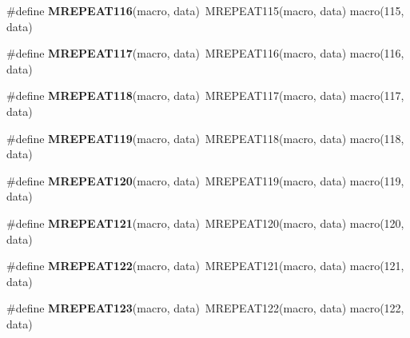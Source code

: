 \begin{DoxyCompactItemize}
\item 
\hypertarget{group__group__sam0__utils__mrepeat_gad60209ee8f18b1ecf655a810044966aa}{}\#define {\bfseries M\+R\+E\+P\+E\+A\+T116}(macro,  data)~M\+R\+E\+P\+E\+A\+T115(macro, data)   macro(115, data)\label{group__group__sam0__utils__mrepeat_gad60209ee8f18b1ecf655a810044966aa}

\item 
\hypertarget{group__group__sam0__utils__mrepeat_gaa23405f68b33c1b3f14c3e45eb3f917a}{}\#define {\bfseries M\+R\+E\+P\+E\+A\+T117}(macro,  data)~M\+R\+E\+P\+E\+A\+T116(macro, data)   macro(116, data)\label{group__group__sam0__utils__mrepeat_gaa23405f68b33c1b3f14c3e45eb3f917a}

\item 
\hypertarget{group__group__sam0__utils__mrepeat_ga74dc399001884d2f1f942b502ce2b9b6}{}\#define {\bfseries M\+R\+E\+P\+E\+A\+T118}(macro,  data)~M\+R\+E\+P\+E\+A\+T117(macro, data)   macro(117, data)\label{group__group__sam0__utils__mrepeat_ga74dc399001884d2f1f942b502ce2b9b6}

\item 
\hypertarget{group__group__sam0__utils__mrepeat_ga0aeae0af7aeb117fb68f133cd352ff17}{}\#define {\bfseries M\+R\+E\+P\+E\+A\+T119}(macro,  data)~M\+R\+E\+P\+E\+A\+T118(macro, data)   macro(118, data)\label{group__group__sam0__utils__mrepeat_ga0aeae0af7aeb117fb68f133cd352ff17}

\item 
\hypertarget{group__group__sam0__utils__mrepeat_ga4a67c3aed21abce662b2668e10a50d4b}{}\#define {\bfseries M\+R\+E\+P\+E\+A\+T120}(macro,  data)~M\+R\+E\+P\+E\+A\+T119(macro, data)   macro(119, data)\label{group__group__sam0__utils__mrepeat_ga4a67c3aed21abce662b2668e10a50d4b}

\item 
\hypertarget{group__group__sam0__utils__mrepeat_ga75b16de882e5c30c0126c306e09d65c1}{}\#define {\bfseries M\+R\+E\+P\+E\+A\+T121}(macro,  data)~M\+R\+E\+P\+E\+A\+T120(macro, data)   macro(120, data)\label{group__group__sam0__utils__mrepeat_ga75b16de882e5c30c0126c306e09d65c1}

\item 
\hypertarget{group__group__sam0__utils__mrepeat_ga002c52a2af11a3a25a748ab09f16a8f5}{}\#define {\bfseries M\+R\+E\+P\+E\+A\+T122}(macro,  data)~M\+R\+E\+P\+E\+A\+T121(macro, data)   macro(121, data)\label{group__group__sam0__utils__mrepeat_ga002c52a2af11a3a25a748ab09f16a8f5}

\item 
\hypertarget{group__group__sam0__utils__mrepeat_gaf0802f3653fa2845f482ec6a119d9260}{}\#define {\bfseries M\+R\+E\+P\+E\+A\+T123}(macro,  data)~M\+R\+E\+P\+E\+A\+T122(macro, data)   macro(122, data)\label{group__group__sam0__utils__mrepeat_gaf0802f3653fa2845f482ec6a119d9260}


\end{DoxyCompactItemize}
